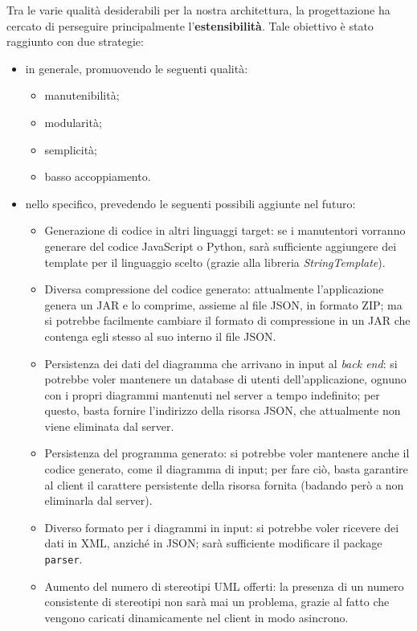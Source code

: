 Tra le varie qualità desiderabili per la nostra architettura, la progettazione ha cercato di perseguire principalmente l'\textbf{estensibilità}. Tale obiettivo è stato raggiunto con due strategie:
\begin{itemize}
	\item in generale, promuovendo le seguenti qualità:
	\begin{itemize}
		\item manutenibilità;
		\item modularità;
		\item semplicità;
		\item basso accoppiamento.
	\end{itemize}
	\item nello specifico, prevedendo le seguenti possibili aggiunte nel futuro:
	\begin{itemize}
		\item Generazione di codice in altri linguaggi target: se i manutentori vorranno generare del codice JavaScript o Python, sarà sufficiente aggiungere dei template per il linguaggio scelto (grazie alla libreria \emph{StringTemplate}).
		\item Diversa compressione del codice generato: attualmente l'applicazione genera un JAR e lo comprime, assieme al file JSON, in formato ZIP; ma si potrebbe facilmente cambiare il formato di compressione in un JAR che contenga egli stesso al suo interno il file JSON.
		\item Persistenza dei dati del diagramma che arrivano in input al \emph{back end}: si potrebbe voler mantenere un database di utenti dell'applicazione, ognuno con i propri diagrammi mantenuti nel server a tempo indefinito; per questo, basta fornire l'indirizzo della risorsa JSON, che attualmente non viene eliminata dal server. %
		\item Persistenza del programma generato: si potrebbe voler mantenere anche il codice generato, come il diagramma di input; per fare ciò, basta garantire al client il carattere persistente della risorsa fornita (badando però a non eliminarla dal server). %
		\item Diverso formato per i diagrammi in input: si potrebbe voler ricevere dei dati in XML, anziché in JSON; sarà sufficiente modificare il package \texttt{parser}.
		\item Aumento del numero di stereotipi UML offerti: la presenza di un numero consistente di stereotipi non sarà mai un problema, grazie al fatto che vengono caricati dinamicamente nel client in modo asincrono.
	\end{itemize}
\end{itemize}



